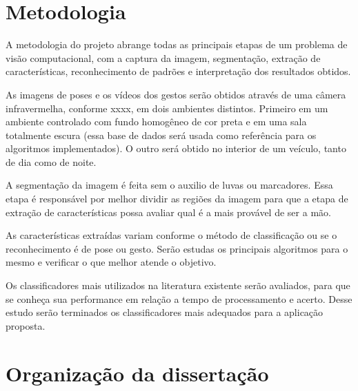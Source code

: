 \section{Metodologia}

A metodologia do projeto abrange todas as principais  etapas de um problema de visão computacional, com a captura da imagem, segmentação, extração de características, reconhecimento de padrões e interpretação dos resultados obtidos.

As imagens de poses e os vídeos dos gestos serão obtidos através de uma câmera infravermelha, conforme xxxx, em  dois ambientes distintos. Primeiro em um ambiente controlado com fundo homogêneo de cor preta e em uma sala totalmente escura (essa base de dados será usada como referência para os algoritmos implementados). O outro será obtido no interior de um veículo, tanto de dia como de noite.

A segmentação da imagem é feita sem o auxilio de luvas ou marcadores. Essa etapa é responsável por melhor dividir as regiões da imagem para que a etapa de extração de características possa avaliar qual é a mais provável de ser a mão.

As características extraídas variam conforme o método de classificação ou se o reconhecimento é de pose ou gesto. Serão estudas os principais algoritmos para o mesmo e verificar o que melhor atende o objetivo.

Os classificadores mais utilizados na literatura existente serão avaliados, para que se conheça sua performance em relação a tempo de processamento e acerto. Desse estudo serão terminados os classificadores mais adequados para a aplicação proposta.

\section{Organização da dissertação}



